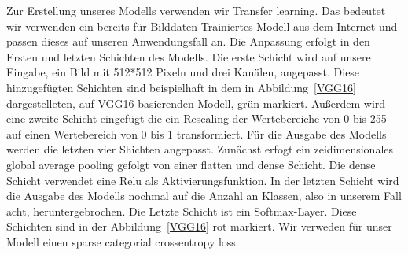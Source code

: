\documentclass{article}
\begin{document}
Zur Erstellung unseres Modells verwenden wir Transfer learning. Das bedeutet wir verwenden ein bereits für Bilddaten Trainiertes Modell aus dem Internet und passen dieses auf unseren Anwendungsfall an. Die Anpassung erfolgt in den Ersten und letzten Schichten des Modells. Die erste Schicht wird auf unsere Eingabe, ein Bild mit 512*512 Pixeln und drei Kanälen, angepasst. Diese hinzugefügten Schichten sind beispielhaft in dem in Abbildung~\ref{VGG16} dargestelleten, auf VGG16 basierenden Modell, grün markiert. Au\ss erdem wird eine zweite Schicht eingefügt die ein Rescaling der Wertebereiche von 0 bis 255 auf einen Wertebereich von 0 bis 1 transformiert. Für die Ausgabe des Modells werden die letzten vier Shichten angepasst. Zunächst erfogt ein zeidimensionales global average pooling gefolgt von einer flatten und dense Schicht. Die dense Schicht verwendet eine Relu als Aktivierungsfunktion. In der letzten Schicht wird die Ausgabe des Modells nochmal auf die Anzahl an Klassen, also in unserem Fall acht, heruntergebrochen. Die Letzte Schicht ist ein Softmax-Layer. Diese Schichten sind in der Abbildung~\ref{VGG16} rot markiert.
\FloatBarrier
Wir verweden für unser Modell einen sparse categorial crossentropy loss.
\end{document}
